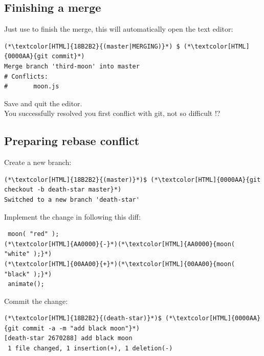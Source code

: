\subsection{Finishing a merge}
\begin{frame}[fragile]
  \subslidetitle

  Just use  to finish the merge, this will automatically open the text editor:
  \begin{lstlisting}
(*\textcolor[HTML]{18B2B2}{(master|MERGING)}*) $ (*\textcolor[HTML]{0000AA}{git commit}*)
Merge branch 'third-moon' into master
# Conflicts:
#       moon.js
\end{lstlisting}
  Save and quit the editor.
  \\
  \vspace{1em}
  You successfully resolved you first conflict with git, not so difficult !?

\end{frame}

\subsection{Preparing rebase conflict}
\begin{frame}[fragile]
  \subslidetitle

  Create a new  branch:
  \begin{lstlisting}
(*\textcolor[HTML]{18B2B2}{(master)}*)$ (*\textcolor[HTML]{0000AA}{git checkout -b death-star master}*)
Switched to a new branch 'death-star'
\end{lstlisting}

  Implement the change in  following this diff:

  \begin{lstlisting}
 moon( "red" );
(*\textcolor[HTML]{AA0000}{-}*)(*\textcolor[HTML]{AA0000}{moon( "white" );}*)
(*\textcolor[HTML]{00AA00}{+}*)(*\textcolor[HTML]{00AA00}{moon( "black" );}*)
 animate();
\end{lstlisting}

  Commit the change:
  \begin{lstlisting}
(*\textcolor[HTML]{18B2B2}{(death-star)}*)$ (*\textcolor[HTML]{0000AA}{git commit -a -m "add black moon"}*)
[death-star 2670288] add black moon
 1 file changed, 1 insertion(+), 1 deletion(-)
\end{lstlisting}
\end{frame}


